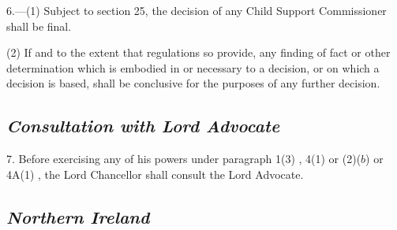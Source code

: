 \documentclass[12pt,a4paper]{article}
\begin{document}
6.---(1) Subject to section 25, the decision of any Child Support Commissioner shall be final.


(2) If and to the extent that regulations so provide, any finding of fact or other determination which is embodied in or necessary to a decision, or on which a decision is based, shall be conclusive for the purposes of any further decision.


\subsection*{\itshape Consultation with Lord Advocate}

7. Before exercising any of his powers under 
paragraph 1(3)%
, 
4(1) or (2)($b$) or 4A(1)%
, the Lord Chancellor shall consult the Lord Advocate.


\subsection*{\itshape Northern Ireland}
\end{document}
